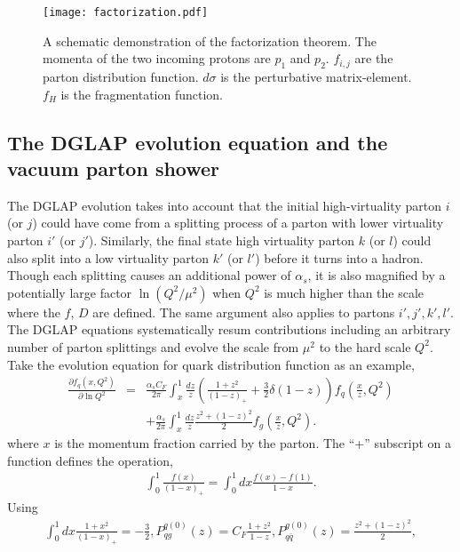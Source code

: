 \begin{figure}
\singlespacing
\centering
\texttt{[image: factorization.pdf]}
\caption[A schematic demonstration of the factorization theorem. The]{A schematic demonstration of the factorization theorem. The momenta of the two incoming protons are $p_1$ and $p_2$. $f_{i,j}$ are the parton distribution function. $d\sigma$ is the perturbative matrix-element. $f_H$ is the fragmentation function.}
\label{fig:factorization}
\end{figure}

\subsection{The DGLAP evolution equation and the vacuum parton shower} The DGLAP evolution takes into account that the initial high-virtuality parton $i$ (or $j$) could have come from a splitting process of a parton with lower virtuality parton $i'$ (or $j'$).
Similarly, the final state high virtuality parton $k$ (or $l$) could also split into a low virtuality parton $k'$ (or $l'$) before it turns into a hadron.
Though each splitting causes an additional power of $\alpha_s$, it is also magnified by a potentially large factor $\ln (Q^2/\mu^2)$ when $Q^2$ is much higher than the scale where the $f$, $D$ are defined.
The same argument also applies to partons $i', j', k', l'$. 
The DGLAP equations systematically resum contributions including an arbitrary number of parton splittings and evolve the scale from $\mu^2$ to the hard scale $Q^2$.
Take the evolution equation for quark distribution function as an example,
\begin{eqnarray}
\frac{\partial f_q(x, Q^2)}{\partial \ln Q^2} &=& \frac{\alpha_s C_F}{2\pi} \int_x^1 \frac{dz}{z} \left(\frac{1+z^2}{(1-z)_+} + \frac{3}{2}\delta(1-z) \right)  f_q\left(\frac{x}{z}, Q^2\right)\\\nonumber
&&+ \frac{\alpha_s}{2\pi} \int_x^1 \frac{dz}{z} \frac{z^2+(1-z)^2}{2}f_g\left(\frac{x}{z}, Q^2\right).
\end{eqnarray}
where $x$ is the momentum fraction carried by the parton. The ``+'' subscript on a function defines the operation,
\begin{eqnarray}
\int_0^1 \frac{f(x)}{(1-x)_+} = \int_0^1 dx \frac{f(x)-f(1)}{1-x}.
\end{eqnarray}
Using
\begin{eqnarray}
\int_0^1 dx \frac{1+x^2}{(1-x)_+} = -\frac{3}{2}, P_{qg}^{q(0)}(z) = C_F\frac{1+z^2}{1-z}, P_{q\bar{q}}^{g(0)}(z) = \frac{z^2+(1-z)^2}{2}, 
\end{eqnarray}
